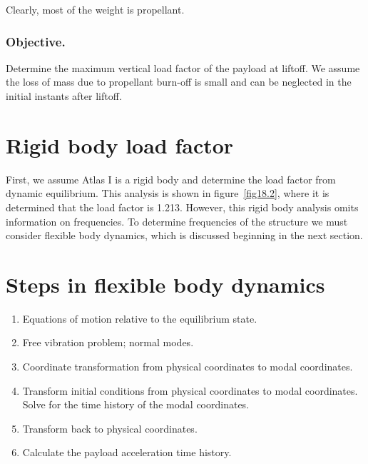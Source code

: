 \documentclass{AeroStructure-ERJohnson}
\begin{document}
Clearly, most of the weight is propellant.

\subsubsection{Objective.} Determine the maximum vertical load factor of the payload at liftoff. We assume the loss of mass due to propellant burn-off is small and can be neglected in the initial instants after liftoff.

\section{Rigid body load factor}\label{sec18.2}
First, we assume Atlas I is a rigid body and determine the load factor from dynamic equilibrium. This analysis is shown in figure~\ref{fig18.2}, where it is determined that the load factor is 1.213. However, this rigid body analysis omits information on frequencies. To determine frequencies of the structure we must consider flexible body dynamics, which is discussed beginning in the next section.

{\def\thefigure{18.2}
}

\pagebreak

\section{Steps in flexible body dynamics}\label{sec18.3}
\begin{enumerate}
  \item Equations of motion relative to the equilibrium state.
  \item Free vibration problem; normal modes.
  \item Coordinate transformation from physical coordinates to modal coordinates.
  \item Transform initial conditions from physical coordinates to modal coordinates. Solve for the time history of the modal coordinates.
  \item Transform back to physical coordinates.
  \item Calculate the payload acceleration time history.
\end{enumerate}
\end{document}
